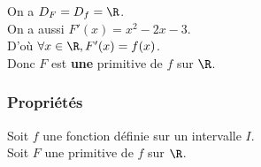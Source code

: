 On a $D_F = D_f = \R$. \\

On a aussi $F'(x) = x^2 - 2x - 3$. \\

D'où $\forall x \in \R, F'(x) = f(x)$. \\

Donc $F$ est \textbf{une} primitive de $f$ sur $\R$. 

\subsubsection{Propriétés}

Soit $f$ une fonction définie sur un intervalle $I$. \\ Soit $F$ une primitive de $f$ sur $\R$. \\

